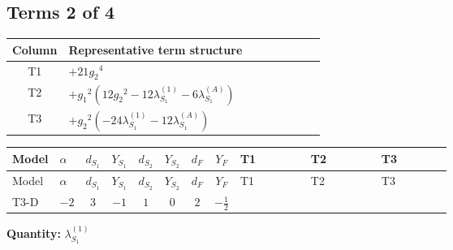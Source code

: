 \documentclass[8pt]{article}
\begin{document}
\begin{landscape}
\subsection*{Terms 2 of 4}
\begin{center}
\begin{tabular}{@{}c >{\raggedright\arraybackslash}p{0.82\linewidth}@{}}
\toprule
Column & Representative term structure \\
\midrule
T1 & \(\displaystyle +21 {g_2}^4\) \\
\midrule
T2 & \(\displaystyle +{g_1}^2 \left(12 {g_2}^2-12 {\lambda_{S_1}^{(1)}}-6 {\lambda_{S_1}^{(A)}}\right)\) \\
\midrule
T3 & \(\displaystyle +{g_2}^2 (-24 {\lambda_{S_1}^{(1)}}-12 {\lambda_{S_1}^{(A)}})\) \\
\midrule
\bottomrule
\end{tabular}
\end{center}
\smallskip
\tiny
\begin{longtable}{@{}llcccccc >{\raggedright\arraybackslash}p{0.21\linewidth} >{\raggedright\arraybackslash}p{0.21\linewidth} >{\raggedright\arraybackslash}p{0.21\linewidth}@{}}
\toprule
Model & $\alpha$ & $d_{S_1}$ & $Y_{S_1}$ & $d_{S_2}$ & $Y_{S_2}$ & $d_F$ & $Y_F$ & T1 & T2 & T3 \\
\midrule
\endfirsthead
\toprule
Model & $\alpha$ & $d_{S_1}$ & $Y_{S_1}$ & $d_{S_2}$ & $Y_{S_2}$ & $d_F$ & $Y_F$ & T1 & T2 & T3 \\
\midrule
\endhead
T3-D & $-2$ & $3$ & $-1$ & $1$ & $0$ & $2$ & $-\frac{1}{2}$ & \scriptsize\adjustbox{max width=\linewidth}{$\begin{gathered} +21 {g_2}^4\end{gathered}$} & \scriptsize\adjustbox{max width=\linewidth}{$\begin{gathered} +{g_1}^2 \left(12 {g_2}^2-12 {\lambda_{S_1}^{(1)}}-6 {\lambda_{S_1}^{(A)}}\right)\end{gathered}$} & \scriptsize\adjustbox{max width=\linewidth}{$\begin{gathered} +{g_2}^2 (-24 {\lambda_{S_1}^{(1)}}-12 {\lambda_{S_1}^{(A)}})\end{gathered}$} \\
\midrule
\bottomrule
\end{longtable}
\clearpage
\noindent\textbf{Quantity: }$\lambda_{S_1}^{(1)}$\par\smallskip

\end{landscape}
\end{document}
